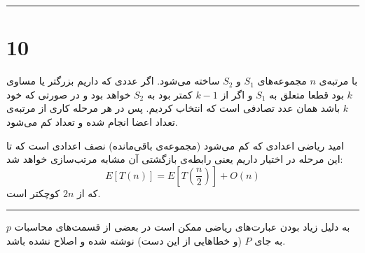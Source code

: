\documentclass{article}
\begin{document}
\rule{\linewidth}{1pt}

\section*{10}
با مرتبه‌ی
$n$
مجموعه‌های
$S_1$
و
$S_2$
ساخته می‌شود. اگر عددی که داریم بزرگتر یا مساوی
$k$
بود قطعا متعلق به
$S_1$
و اگر از
$k-1$
کمتر بود به
$S_2$
خواهد بود و در صورتی که خود
$k$
باشد همان عدد تصادفی است که انتخاب کردیم. پس در هر مرحله کاری از مرتبه‌ی تعداد اعضا انجام شده و تعداد کم می‌شود.

امید ریاضی اعدادی که کم می‌شود (مجموعه‌ی باقی‌مانده) نصف اعدادی است که تا این مرحله در اختیار داریم یعنی رابطه‌ی بازگشتی آن مشابه مرتب‌سازی خواهد شد:
$$E \left[ T\left( n\right) \right] =E \left[ T\left( \dfrac{n}{2}\right) \right] +O\left( n\right)$$
که از 
$2n$
کوچکتر است.

\rule{\linewidth}{1pt}
به دلیل زیاد بودن عبارت‌های ریاضی ممکن است در بعضی از قسمت‌های محاسبات
$p$
به جای
$P$
(و خطاهایی از این دست)
نوشته شده و اصلاح نشده باشد.
\end{document}
